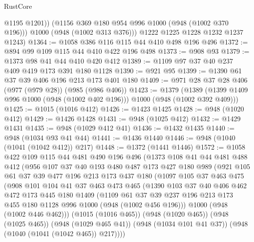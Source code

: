 \begin{lexlean}{RustCore}
\begin{coremodule}
            @1195
            @1201))
        (@1156 @369 @180 @954 @996 @1000 (@948 (@1002 @370 @196)))
        @1000
        (@948 (@1002 @313 @376)))
      @1222
      @1225
      @1228
      @1232
      @1237
      @1243)
@1364 := @1058 @386 @116 @115 @44 @410 @498 @196 @496
@1372 := @894 @99 @109 @115 @44 @410 @422 @196 @498
@1373 := @908 @93
@1379 := @1373 @98 @41 @44 @410 @420 @412
@1389 := @1109 @97 @37 @40 @237 @409 @419 @173 @391 @180 @1128
@1390 := @921 @95
@1399 := @1390 @61 @37 @39 @406 @196 @213 @173 @401 @180
@1409 := @971 @28 @37 @28 @406 (@977 (@979 @28)) (@985 (@986 @406))
@1423 := @1379
    (@1389 (@1399 @1409 @996 @1000 (@948 (@1002 @402 @196))) @1000 (@948 (@1002 @392 @409)))
@1425 := @1015 (@1016 @412)
@1426 := @1423 @1425
@1428 := @948 (@1020 @412)
@1429 := @1426 @1428
@1431 := @948 (@1025 @412)
@1432 := @1429 @1431
@1435 := @948 (@1029 @412 @41)
@1436 := @1432 @1435
@1440 := @948 (@1034 @93 @41 @44)
@1441 := @1436 @1440
@1446 := @948 (@1040 (@1041 (@1042 @412)) @217)
@1448 := @1372 (@1441 @1446)
@1572 := @1058
    @422
    @109
    @115
    @44
    @481
    @490
    @196
    @496
    (@1373
      @108
      @41
      @44
      @481
      @488
      @412
      (@956
        @107
        @37
        @40
        @193
        @480
        @487
        @173
        @427
        @180
        @989
        (@921
          @105
          @61
          @37
          @39
          @477
          @196
          @213
          @173
          @437
          @180
          (@1097
            @105
            @37
            @463
            @475
            (@908
              @101
              @104
              @41
              @37
              @463
              @473
              @465
              (@1390
                @103
                @37
                @40
                @406
                @462
                @472
                @173
                @445
                @180
                @1409
                (@1109
                  @61
                  @37
                  @39
                  @237
                  @196
                  @213
                  @173
                  @455
                  @180
                  @1128
                  @996
                  @1000
                  (@948 (@1002 @456 @196)))
                @1000
                (@948 (@1002 @446 @462)))
              (@1015 (@1016 @465))
              (@948 (@1020 @465))
              (@948 (@1025 @465))
              (@948 (@1029 @465 @41))
              (@948 (@1034 @101 @41 @37))
              (@948 (@1040 (@1041 (@1042 @465)) @217))))

\end{coremodule}
\end{lexlean}
